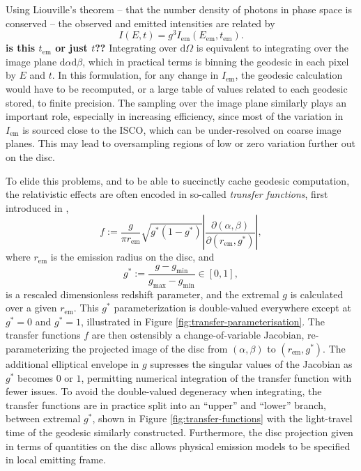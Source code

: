 \documentclass[fleqn,usenatbib]{mnras}
\newcommand{\todo}[1]{{\bf \color{red} #1}}
\renewcommand{\d}{\text{d}}
\newcommand{\jacobian}[2]{\left\lvert \frac{\partial #1}{\partial #2} \right\rvert}
\begin{document}
Using Liouville's theorem -- that the number density of photons in phase space is conserved -- the observed and emitted intensities are related by
\begin{equation}
\label{eq:liouville-theorem}
    I\left( E, t \right) = g^3 I_\text{em}\left(E_\text{em}, t_\text{em}\right).
\end{equation}
\todo{is this $t_\text{em}$ or just $t$??}
Integrating over $\d \Omega$ is equivalent to integrating over the image plane $\d \alpha \d \beta$, which in practical terms is binning the geodesic in each pixel by $E$ and $t$. In this formulation, for any change in $I_\text{em}$, the geodesic calculation would have to be recomputed, or a large table of values related to each geodesic stored, to finite precision. The sampling over the image plane similarly plays an important role, especially in increasing efficiency, since most of the variation in $I_\text{em}$ is sourced close to the ISCO, which can be under-resolved on coarse image planes. This may lead to oversampling regions of low or zero variation further out on the disc.

To elide this problems, and to be able to succinctly cache geodesic computation, the relativistic effects are often encoded in so-called \emph{transfer functions}, first introduced in \cite{cunningham_effects_1975},
\begin{equation}
    f:=\frac{g}{\pi r_\text{em}} \sqrt{g^\ast(1 - g^\ast)} \jacobian{(\alpha, \beta)}{(r_\text{em}, g^\ast)},
\end{equation}
where $r_\text{em}$ is the emission radius on the disc, and
\begin{equation}
    g^\ast := \frac{g - g_\text{min}}{g_\text{max} - g_\text{min}} \in [0, 1],
\end{equation}
is a rescaled dimensionless redshift parameter, and the extremal $g$ is calculated over a given $r_\text{em}$. This $g^\ast$ parameterization is double-valued everywhere except at $g^\ast = 0$ and $g^\ast = 1$, illustrated in Figure \ref{fig:transfer-parameterisation}. The transfer functions $f$ are then ostensibly a change-of-variable Jacobian, re-parameterizing the projected image of the disc from $(\alpha, \beta)$ to $(r_\text{em}, g^\ast)$. The additional elliptical envelope in $g$ supresses the singular values of the Jacobian as $g^\ast$ becomes $0$ or $1$, permitting numerical integration of the transfer function with fewer issues. To avoid the double-valued degeneracy when integrating, the transfer functions are in practice split into an ``upper'' and ``lower'' branch, between extremal $g^\ast$, shown in Figure \ref{fig:transfer-functions} with the light-travel time of the geodesic similarly constructed. Furthermore, the disc projection given in terms of quantities on the disc allows physical emission models to be specified in local emitting frame.
\end{document}
